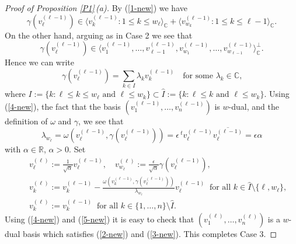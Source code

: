 \documentclass{amsart}
\theoremstyle{definition}
\begin{document}
\begin{proof}[Proof of Proposition \ref{P1}\,{\rm (a)}]
By (\ref{1-new}) we have
\[\gamma(v_\ell^{(\ell-1)})\in
\langle v_k^{(\ell-1)}:1\leq k\leq w_\ell\rangle_\mathbb{C}+\langle v_{w_k}^{(\ell-1)}:1\leq k\leq \ell-1\rangle_\mathbb{C}.
\]
On the other hand, arguing as in Case 2 we see that
\[\gamma(v_\ell^{(\ell-1)})\in\langle v_1^{(\ell-1)},\ldots,v_{\ell-1}^{(\ell-1)},v_{w_1}^{(\ell-1)},\ldots,v_{w_{\ell-1}}^{(\ell-1)}\rangle_\mathbb{C}^\perp.\]
Hence we can write
\begin{equation}
\label{4-new}
\gamma(v_\ell^{(\ell-1)})=\sum_{k\in I}\lambda_kv_k^{(\ell-1)}
\quad\mbox{for some $\lambda_k\in\mathbb{C}$,}
\end{equation}
where $I:=\{k:\ell\leq k\leq w_\ell\mbox{ and }\ell\leq w_k\}\subset\hat{I}:=\{k:\ell\leq k\mbox{ and }\ell\leq w_k\}$.
Using (\ref{4-new}), the fact that the basis $(v_1^{(\ell-1)},\ldots,v_n^{(\ell-1)})$ is $w$-dual, and the definition of $\omega$ and $\gamma$, we see that
\begin{equation}
\label{5-new}
\lambda_{w_\ell}=\omega(v_\ell^{(\ell-1)},\gamma(v_\ell^{(\ell-1)}))=\epsilon\,^tv_\ell^{(\ell-1)}\overline{v_\ell^{(\ell-1)}}=\epsilon\alpha
\end{equation}
with $\alpha\in\mathbb{R}$, $\alpha>0$.
Set 
\begin{eqnarray*}
 && v_\ell^{(\ell)}:=\frac{1}{\sqrt{\alpha}}v_\ell^{(\ell-1)},\quad
v_{w_\ell}^{(\ell)}:=\frac{\epsilon}{\sqrt{\alpha}}\gamma(v_\ell^{(\ell-1)}),\\
 && v_k^{(\ell)}:=v_k^{(\ell-1)}-\frac{\omega(v_k^{(\ell-1)},\gamma(v_\ell^{(\ell-1)}))}{\lambda_{w_\ell}}v_\ell^{(\ell-1)}\ \mbox{ for all $k\in \hat{I}\setminus\{\ell,w_\ell\}$}, \\
&& v_k^{(\ell)}:=v_k^{(\ell-1)}\ \mbox{ for all $k\in\{1,\ldots,n\}\setminus \hat{I}$.}
\end{eqnarray*}
Using (\ref{4-new}) and (\ref{5-new}) it is easy to check that $(v_1^{(\ell)},\ldots,v_n^{(\ell)})$ is a $w$-dual basis which satisfies (\ref{2-new}) and (\ref{3-new}).
This completes Case 3.
\end{proof}
\end{document}
